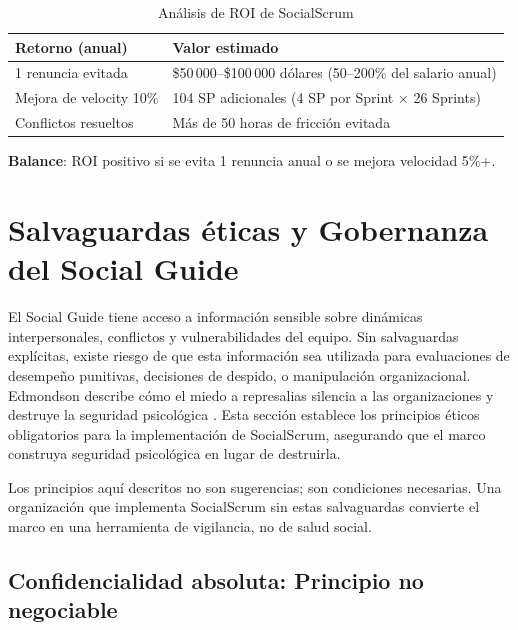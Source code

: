 \begin{table}[h]
    \centering
    \small
    \begin{tabularx}{\textwidth}{|l|X|}
        \hline
        \textbf{Retorno (anual)} & \textbf{Valor estimado}                                     \\
        \hline
        1 renuncia evitada
                                 & \$50\,000--\$100\,000 dólares (50--200\% del salario anual) \\
        \hline
        Mejora de velocity 10\%
                                 & 104 SP adicionales (4 SP por Sprint $\times$ 26 Sprints)    \\
        \hline
        Conflictos resueltos
                                 & Más de 50 horas de fricción evitada                         \\
        \hline
    \end{tabularx}
    \caption{Análisis de ROI de SocialScrum}
    \label{tab:roi-socialscrum}
\end{table}
\FloatBarrier

\textbf{Balance}: ROI positivo si se evita 1 renuncia anual o se mejora velocidad 5\%+.

\section{Salvaguardas éticas y Gobernanza del Social Guide}

El Social Guide tiene acceso a información sensible sobre dinámicas interpersonales, conflictos y vulnerabilidades del equipo. Sin salvaguardas explícitas, existe riesgo de que esta información sea utilizada para evaluaciones de desempeño punitivas, decisiones de despido, o manipulación organizacional. Edmondson \cite{edmondson2018fearless} describe cómo el miedo a represalias silencia a las organizaciones y destruye la seguridad psicológica \cite{edmondson1999psychological}. Esta sección establece los principios éticos obligatorios para la implementación de SocialScrum, asegurando que el marco construya seguridad psicológica en lugar de destruirla.

Los principios aquí descritos no son sugerencias; son condiciones necesarias. Una organización que implementa SocialScrum sin estas salvaguardas convierte el marco en una herramienta de vigilancia, no de salud social.

\subsection{Confidencialidad absoluta: Principio no negociable}

